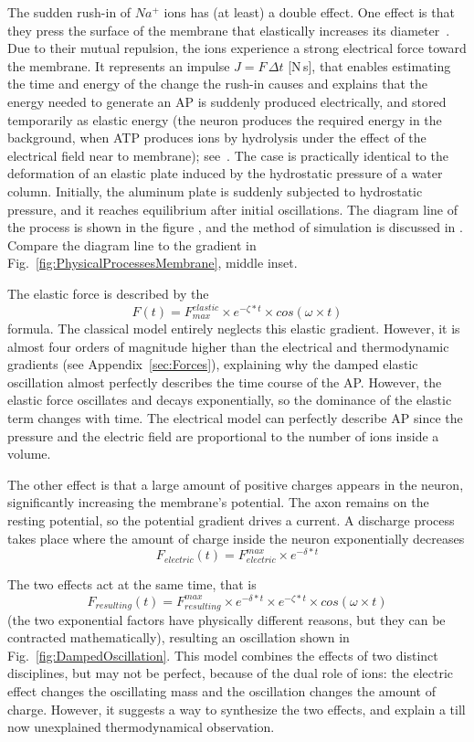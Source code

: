 The sudden rush-in of
$Na^+$ ions has (at least) a double effect. 
One effect is that they press the surface of the membrane that
elastically increases its diameter~\cite{NeuronalDeformation:2020}.
Due to their mutual repulsion,
the ions experience a strong electrical force toward the membrane. It represents an impulse $J=F\,\Delta t$ [N\,s], that enables estimating the time and energy of the 
change the rush-in causes and explains that the energy needed to 
generate an \gls{AP} is suddenly produced electrically, 
and stored temporarily as elastic energy (the neuron produces the required energy in the background, when \gls{ATP} produces ions by hydrolysis under the effect of the electrical field near to membrane); see~\cite{VeghUnifiedCrossdisciplinaryModel:2026}. 
The case is practically identical to
the deformation of an elastic plate induced by the hydrostatic pressure of a water column. Initially, the aluminum plate is suddenly subjected to hydrostatic pressure, and it reaches equilibrium after initial oscillations. The diagram line of the process is shown in the figure
\cite{HydrostaticWaterColumn:2021}, and the method of simulation is discussed in \cite{Hydrostatic_SPHinXsys:2021}. Compare the diagram line to the
gradient in Fig.~\ref{fig:PhysicalProcessesMembrane}, middle inset.

The elastic force is described by the  
\[
F(t) = F_{max}^{elastic}\times e^{-\zeta*t}\times cos(\omega\times t)
\]
\noindent 
formula. The classical model entirely neglects this elastic gradient. However, it is almost four orders of magnitude higher than the electrical and thermodynamic gradients (see Appendix~\ref{sec:Forces}), explaining why the damped elastic oscillation almost perfectly describes 
the time course of the \gls{AP}. However, the elastic force oscillates and decays exponentially, so the dominance of 
the elastic term changes with time.
The electrical model can perfectly describe \gls{AP} since 
the pressure and the electric field are proportional to the number of ions inside a volume.

The other effect is that a large amount of positive charges
appears in the neuron, significantly increasing the membrane's potential. The axon remains on the resting potential, so the potential gradient drives a current.
A discharge process takes place where the amount of charge
inside the neuron exponentially decreases 
\[
F_{electric}(t) = F^{max}_{electric}\times e^{-\delta*t}
\]

The two effects act at the same time, that is
\[
F_{resulting}(t) = F^{max}_{resulting}\times e^{-\delta*t}  \times e^{-\zeta*t}  \times cos(\omega\times t)
\]
(the two exponential factors have physically different reasons,
but they can be contracted mathematically), resulting
an oscillation shown in Fig.~\ref{fig:DampedOscillation}.
This model combines the effects of two distinct disciplines,
but may not be perfect, because of the dual role of ions:
the electric effect changes the oscillating mass and the oscillation changes the amount of charge. However, it 
suggests a way to synthesize the two effects, and explain 
a till now unexplained thermodynamical observation.


